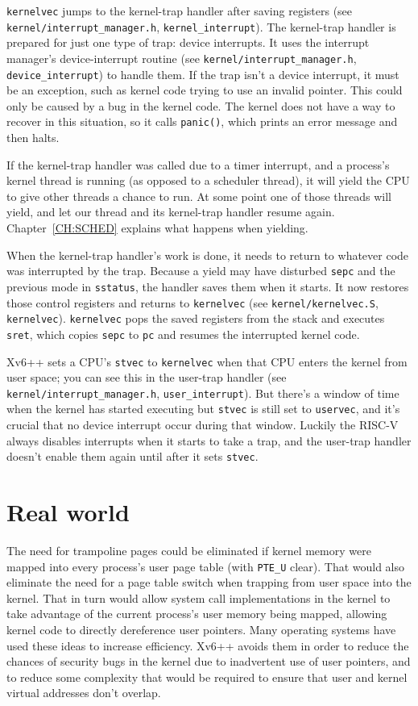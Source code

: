 {\tt kernelvec} jumps to the kernel-trap handler after saving registers
(see \texttt{kernel/interrupt\_manager.h}, \texttt{kernel\_interrupt}).
The kernel-trap handler is prepared for just one type of trap:
device interrupts. It uses the interrupt manager's device-interrupt routine
(see \texttt{kernel/interrupt\_manager.h}, \texttt{device\_interrupt})
to handle them.
If the trap isn't a device interrupt, it must be an exception,
such as kernel code trying to use an invalid pointer.
This could only be caused by a bug in the kernel code.
The kernel does not have a way to recover in this situation,
so it calls {\tt panic()}, which prints an error message
and then halts.

If the kernel-trap handler was called due to a timer interrupt, and a
process's kernel thread is running (as opposed to a scheduler thread),
it will yield the CPU to give other threads a chance to
run. At some point one of those threads will yield, and let our thread
and its kernel-trap handler resume again.
Chapter~\ref{CH:SCHED} explains what happens when yielding.

When the kernel-trap handler's work is done, it needs to return to whatever
code was interrupted by the trap. Because a yield may have
disturbed {\tt sepc} and the previous mode in {\tt sstatus},
the handler saves them when it starts. It now restores those
control registers and returns to {\tt kernelvec}
(see \texttt{kernel/kernelvec.S}, \texttt{kernelvec}).
{\tt kernelvec} pops the saved registers from the stack and
executes {\tt sret}, which copies {\tt sepc} to {\tt pc}
and resumes the interrupted kernel code.

Xv6++ sets a CPU's {\tt stvec} to {\tt kernelvec} when that CPU
enters the kernel from user space; you can see this in the user-trap handler
(see \texttt{kernel/interrupt\_manager.h}, \texttt{user\_interrupt}).
But there's a window of time when the kernel has started executing
but {\tt stvec} is still set to {\tt uservec}, and it's crucial that
no device interrupt occur during that window.
Luckily the RISC-V always disables interrupts when it starts
to take a trap, and the user-trap handler doesn't enable them again until
after it sets {\tt stvec}.

\section{Real world}

The need for trampoline pages could be eliminated if kernel
memory were mapped into every process's user page table (with
\lstinline{PTE_U} clear).
That would
also eliminate the need for a page table switch when trapping from
user space into the kernel. That in turn would allow system call
implementations in the kernel to take advantage of the current
process's user memory being mapped, allowing kernel code to directly
dereference user pointers. Many operating systems have used these ideas to
increase efficiency. Xv6++ avoids them in order to reduce the chances of
security bugs in the kernel due to inadvertent use of user pointers,
and to reduce some complexity that would be required to ensure that
user and kernel virtual addresses don't overlap.

